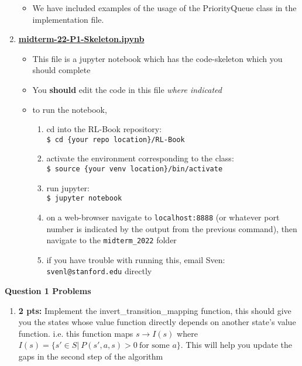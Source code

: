 \documentclass[12pt]{exam}
\begin{document}
\begin{questions}
\begin{enumerate}
\begin{itemize}
        \item We have included examples of the usage of the PriorityQueue class in the implementation file.
    \end{itemize}
    \item {\bf \href{https://github.com/TikhonJelvis/RL-book/tree/master/rl/midterm\_2022/midterm-22-P1-Skeleton.ipynb}{midterm-22-P1-Skeleton.ipynb}}
    \begin{itemize}
        \item This file is a jupyter notebook which has the code-skeleton which you should complete
        \item You {\bf should}  edit the code in this file {\em where indicated}
        \item to run the notebook, 
        \begin{enumerate}
            \item cd into the RL-Book repository: \\
                \verb|$ cd {your repo location}/RL-Book| 
            \item activate the environment corresponding to the class:\\
                \verb|$ source {your venv location}/bin/activate| 
            \item run jupyter: \\
                \verb|$ jupyter notebook| 
            \item on a web-browser navigate to \verb|localhost:8888| (or whatever port number is indicated by the output from the previous command), then navigate to the \verb|midterm_2022| folder 
            \item if you have trouble with running this, email Sven: \verb|svenl@stanford.edu| directly
        \end{enumerate}
    \end{itemize}
\end{enumerate}


\bigskip

\textbf{Question 1 Problems}

\begin{enumerate}
    \item {\bf 2 pts:} Implement the invert\_transition\_mapping function, this should give you the states whose value function directly depends on another state's value function. i.e. this function maps $s \xrightarrow{} I(s)$ where $I(s) = \{s' \in S|\ P(s',a,s) >0\ \text{for some } a\}$. This will help you update the gaps in the second step of the algorithm
    

\end{enumerate}
\end{questions}
\end{document}
